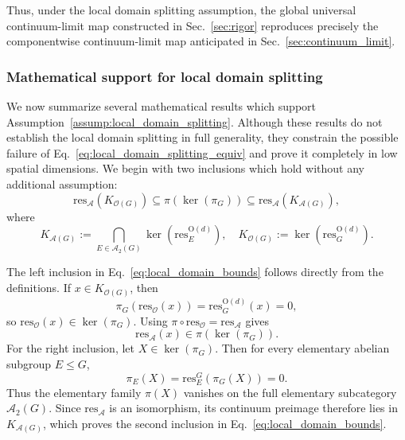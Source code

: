 \documentclass[aps,prx,reprint,superscriptaddress,twocolumn,amsmath,amssymb,amsfonts, nofootinbib]{revtex4-2}
\newcommand{\res}{\text{res}}
\theoremstyle{apsstyle}
\begin{document}
\noindent Thus, under the local domain splitting assumption, the global universal continuum-limit map constructed in Sec.~\ref{sec:rigor} reproduces precisely the componentwise continuum-limit map anticipated in Sec.~\ref{sec:continuum_limit}.


\subsubsection{Mathematical support for local domain splitting}
\label{app:local_domain_splitting_support}

We now summarize several mathematical results which support
Assumption~\ref{assump:local_domain_splitting}. Although these results do not establish the local domain splitting in full generality, they constrain the possible failure of
Eq.~\ref{eq:local_domain_splitting_equiv} and prove it completely in low spatial dimensions. We begin with two inclusions which hold without any additional assumption:
\begin{equation}
    \res_{\mathcal A}(K_{\mathcal O(G)})
    \subseteq
    \pi(\ker(\pi_G))
    \subseteq
    \res_{\mathcal A}(K_{\mathcal A(G)}),
    \label{eq:local_domain_bounds}
\end{equation}
where
\begin{equation*}
    K_{\mathcal A(G)}
    :=\bigcap_{E\in\mathcal A_2(G)}
    \ker\!\left(
        \res_E^{\mathrm{O}(d)}
    \right),\quad  
    K_{\mathcal O(G)}
    :=\ker\!\left(  \res_G^{\mathrm{O}(d)}\right).
\end{equation*}

The left inclusion in Eq.~\ref{eq:local_domain_bounds} follows directly from the definitions. If
$x\in K_{\mathcal O(G)}$, then
\begin{equation*}
    \pi_G(\res_{\mathcal O}(x))
    =
    \res_G^{\mathrm{O}(d)}(x)
    =
    0,
\end{equation*}
so $\res_{\mathcal O}(x)\in\ker(\pi_G)$. Using
$\pi\circ\res_{\mathcal O}=\res_{\mathcal A}$ gives
\begin{equation*}
    \res_{\mathcal A}(x)
    \in
    \pi(\ker(\pi_G)).
\end{equation*}
For the right inclusion, let $X\in\ker(\pi_G)$. Then for every elementary abelian subgroup $E\leq G$,
\begin{equation*}
    \pi_E(X)
    =
    \res_E^G(\pi_G(X))
    =
    0.
\end{equation*}
Thus the elementary family $\pi(X)$ vanishes on the full elementary subcategory
$\mathcal A_2(G)$. Since $\res_{\mathcal A}$ is an isomorphism, its continuum preimage therefore lies in $K_{\mathcal A(G)}$, which proves the second inclusion in
Eq.~\ref{eq:local_domain_bounds}.
\end{document}

